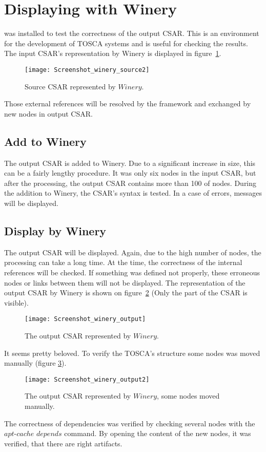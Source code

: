 \section{Displaying with Winery}\label{sec:checkwin}
  was installed to test the correctness of the output CSAR. 
 This is an environment for the development of TOSCA systems and is useful for checking the results. \\
 The input CSAR's representation by Winery is displayed in figure~\ref{fig:winery_source2}.
\begin{figure}[ht]   
	\centering
	\texttt{[image: Screenshot\_winery\_source2]}
	\caption{Source CSAR represented by $Winery$.}
	\label{fig:winery_source2}
\end{figure}
 Those external references will be resolved by the framework and exchanged by new nodes in output CSAR. 
 \subsection*{Add to Winery}
 The output CSAR is added to Winery.
 Due to a significant increase in size, this can be a fairly lengthy procedure.
 It was only six nodes in the input CSAR, but after the processing, the output CSAR contains more than 100 of nodes.
 During the addition to Winery, the CSAR's syntax is tested.
 In a case of errors, messages will be displayed.
 \subsection*{Display by Winery}
 The output CSAR will be displayed.
 Again, due to the high number of nodes, the processing can take a long time. 
 At the time, the correctness of the internal references will be checked.
 If something was defined not properly, these erroneous nodes or links between them will not be displayed.
The representation of the output CSAR by Winery is shown on figure~\ref{fig:winery_output} (Only the part of the CSAR is visible).
\begin{figure}[ht]   
	\centering
	\texttt{[image: Screenshot\_winery\_output]}  
	\caption{The output CSAR represented by $Winery$.}
	\label{fig:winery_output}
\end{figure}
 It seems pretty beloved.
 To verify the TOSCA's structure some nodes was moved manually (figure \ref{fig:winery_output2}). 
 \begin{figure}[ht]   
 	\centering
 	\texttt{[image: Screenshot\_winery\_output2]}
 	\caption{The output CSAR represented by $Winery$, some nodes moved manually.}
 	\label{fig:winery_output2}
 \end{figure}
 The correctness of dependencies was verified by checking several nodes with the $apt$-$cache$ $depends$ command.
 By opening the content of the new nodes, it was verified, that there are right artifacts.

